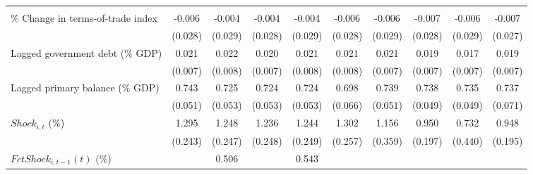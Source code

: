 {\begin{tabular}{l*{9}{c}}
                    &                     &                     &                     &                     &                     &                     &                     &                     &                     \\
\addlinespace
\% Change in terms-of-trade index&      -0.006         &      -0.004         &      -0.004         &      -0.004         &      -0.006         &      -0.006         &      -0.007         &      -0.006         &      -0.007         \\
                    &     (0.028)         &     (0.029)         &     (0.028)         &     (0.029)         &     (0.028)         &     (0.029)         &     (0.028)         &     (0.029)         &     (0.027)         \\
\addlinespace
Lagged government debt (\% GDP)&       0.021\sym{***}&       0.022\sym{**} &       0.020\sym{**} &       0.021\sym{**} &       0.021\sym{**} &       0.021\sym{**} &       0.019\sym{**} &       0.017\sym{**} &       0.019\sym{**} \\
                    &     (0.007)         &     (0.008)         &     (0.007)         &     (0.008)         &     (0.008)         &     (0.007)         &     (0.007)         &     (0.007)         &     (0.007)         \\
\addlinespace
Lagged primary balance (\% GDP)&       0.743\sym{***}&       0.725\sym{***}&       0.724\sym{***}&       0.724\sym{***}&       0.698\sym{***}&       0.739\sym{***}&       0.738\sym{***}&       0.735\sym{***}&       0.737\sym{***}\\
                    &     (0.051)         &     (0.053)         &     (0.053)         &     (0.053)         &     (0.066)         &     (0.051)         &     (0.049)         &     (0.049)         &     (0.071)         \\
\addlinespace
$ Shock_{i,t}$ (\%) &       1.295\sym{***}&       1.248\sym{***}&       1.236\sym{***}&       1.244\sym{***}&       1.302\sym{***}&       1.156\sym{***}&       0.950\sym{***}&       0.732         &       0.948\sym{***}\\
                    &     (0.243)         &     (0.247)         &     (0.248)         &     (0.249)         &     (0.257)         &     (0.359)         &     (0.197)         &     (0.440)         &     (0.195)         \\
\addlinespace
$ FctShock_{i,t-1}(t)$ (\%)&                     &       0.506         &                     &       0.543         &                     &                     &                     &                     &                     \\

\end{tabular}}
